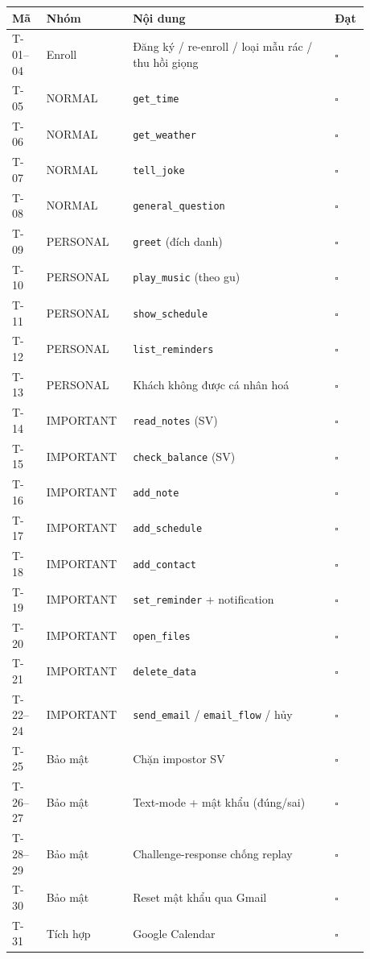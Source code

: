 \documentclass[12pt,a4paper]{article}
\begin{document}
\begin{longtable}{p{0.09\linewidth}p{0.20\linewidth}p{0.53\linewidth}p{0.06\linewidth}}
\toprule
\textbf{Mã} & \textbf{Nhóm} & \textbf{Nội dung} & \textbf{Đạt} \\
\midrule
\endhead
T-01--04 & Enroll & Đăng ký / re-enroll / loại mẫu rác / thu hồi giọng & $\square$ \\
T-05 & NORMAL & \texttt{get\_time} & $\square$ \\
T-06 & NORMAL & \texttt{get\_weather} & $\square$ \\
T-07 & NORMAL & \texttt{tell\_joke} & $\square$ \\
T-08 & NORMAL & \texttt{general\_question} & $\square$ \\
T-09 & PERSONAL & \texttt{greet} (đích danh) & $\square$ \\
T-10 & PERSONAL & \texttt{play\_music} (theo gu) & $\square$ \\
T-11 & PERSONAL & \texttt{show\_schedule} & $\square$ \\
T-12 & PERSONAL & \texttt{list\_reminders} & $\square$ \\
T-13 & PERSONAL & Khách không được cá nhân hoá & $\square$ \\
T-14 & IMPORTANT & \texttt{read\_notes} (SV) & $\square$ \\
T-15 & IMPORTANT & \texttt{check\_balance} (SV) & $\square$ \\
T-16 & IMPORTANT & \texttt{add\_note} & $\square$ \\
T-17 & IMPORTANT & \texttt{add\_schedule} & $\square$ \\
T-18 & IMPORTANT & \texttt{add\_contact} & $\square$ \\
T-19 & IMPORTANT & \texttt{set\_reminder} + notification & $\square$ \\
T-20 & IMPORTANT & \texttt{open\_files} & $\square$ \\
T-21 & IMPORTANT & \texttt{delete\_data} & $\square$ \\
T-22--24 & IMPORTANT & \texttt{send\_email} / \texttt{email\_flow} / hủy & $\square$ \\
T-25 & Bảo mật & Chặn impostor SV & $\square$ \\
T-26--27 & Bảo mật & Text-mode + mật khẩu (đúng/sai) & $\square$ \\
T-28--29 & Bảo mật & Challenge-response chống replay & $\square$ \\
T-30 & Bảo mật & Reset mật khẩu qua Gmail & $\square$ \\
T-31 & Tích hợp & Google Calendar & $\square$ \\

\end{longtable}
\end{document}
